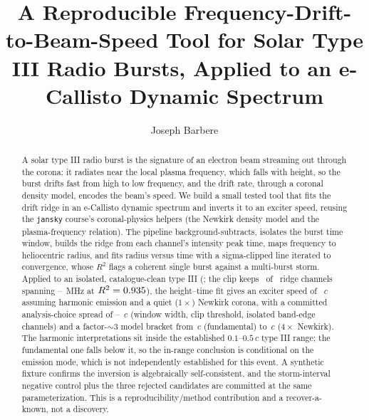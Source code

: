\documentclass[twocolumn]{aastex631}
\newcommand{\code}[1]{\texttt{#1}}
\begin{document}
\title{A Reproducible Frequency-Drift-to-Beam-Speed Tool for Solar Type III Radio
Bursts, Applied to an e-Callisto Dynamic Spectrum}

\author[0009-0008-3289-4447]{Joseph Barbere}

\begin{abstract}
A solar type III radio burst is the signature of an electron beam streaming out through the corona: it
radiates near the local plasma frequency, which falls with height, so the burst drifts fast from high to
low frequency, and the drift rate, through a coronal density model, encodes the beam's speed. We
build a small tested tool that fits the drift ridge in an e-Callisto \citep{benz2009} dynamic spectrum
and inverts it to an exciter speed, reusing the \code{jansky} course's coronal-physics helpers (the
Newkirk \citeyearpar{newkirk1961} density model and the plasma-frequency relation). The pipeline
background-subtracts, isolates the burst time window, builds the ridge from each channel's intensity
peak time, maps frequency to heliocentric radius, and fits radius versus time with a sigma-clipped
line iterated to convergence, whose $R^2$ flags a coherent single burst against a multi-burst
storm. Applied to an isolated, catalogue-clean type III (\sbSource; the clip keeps \sbNused\ of
\sbNridge\ ridge channels spanning \sbFitFlo--\sbFitFhi~MHz at $R^2=0.935$), the height--time fit
gives an exciter speed of \sbSpeedC~$c$ assuming harmonic emission and a quiet ($1\times$) Newkirk
corona, with a committed analysis-choice spread of \sbSpeedCMin--\sbSpeedCMax~$c$ (window width,
clip threshold, isolated band-edge channels) and a factor-$\sim$3 model bracket from
\sbGridFundOne$\,c$ (fundamental) to \sbGridHarmFour$\,c$ ($4\times$ Newkirk). The harmonic
interpretations sit inside the established $0.1$--$0.5\,c$ type III range; the fundamental one
falls below it, so the in-range conclusion is conditional on the emission mode, which is not
independently established for this event. A synthetic fixture confirms the inversion is
algebraically self-consistent, and the storm-interval negative control plus the three rejected
candidates are committed at the same parameterization. This is a reproducibility/method
contribution and a recover-a-known, not a discovery.
\end{abstract}

\end{document}
